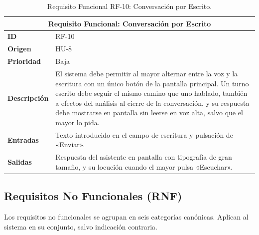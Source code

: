 \begin{table}[htbp]
    \centering
    \renewcommand{\arraystretch}{1.3}
    \begin{tabular}{|l|>{\raggedright\arraybackslash}p{}|}
        \hline
        \multicolumn{2}{|c|}{\textbf{Requisito Funcional: Conversación por Escrito}} \\
        \hline
        \textbf{ID} & RF-10 \\
        \hline
        \textbf{Origen} & HU-8 \\
        \hline
        \textbf{Prioridad} & Baja \\
        \hline
        \textbf{Descripción} & El sistema debe permitir al mayor alternar entre la voz y la escritura
            con un único botón de la pantalla principal. Un turno escrito debe seguir el mismo camino que
            uno hablado, también a efectos del análisis al cierre de la conversación, y su respuesta debe
            mostrarse en pantalla sin leerse en voz alta, salvo que el mayor lo pida. \\
        \hline
        \textbf{Entradas} & Texto introducido en el campo de escritura y pulsación de «Enviar». \\
        \hline
        \textbf{Salidas} & Respuesta del asistente en pantalla con tipografía de gran tamaño, y su locución
            cuando el mayor pulsa «Escuchar». \\
        \hline
    \end{tabular}
    \caption{Requisito Funcional RF-10: Conversación por Escrito.}
    \label{tab:rf10}
\end{table}

\subsection{Requisitos No Funcionales (RNF)}

Los requisitos no funcionales se agrupan en seis categorías canónicas. Aplican al sistema en su conjunto,
salvo indicación contraria.

